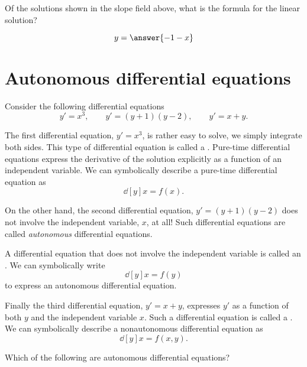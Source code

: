 \documentclass{ximera}
\begin{document}
\begin{question}
  Of the solutions shown in the slope field above, what is the formula
  for the linear solution?
  \begin{prompt}
    \[
    y = \answer{-1-x}
    \]
  \end{prompt}
\end{question}



\section{Autonomous differential equations}


Consider the following differential equations
\[
y' = x^3,\qquad y'=(y+1)(y-2), \qquad y'= x+y.
\]

The first differential equation, $y' = x^3$, is rather easy to solve,
we simply integrate both sides. This type of differential equation is
called a . Pure-time differential
equations express the derivative of the solution explicitly as a
function of an independent variable. We can symbolically describe a
pure-time differential equation as
\[
\dd[y]{x} = f(x).
\]

On the other hand, the second differential equation, $y'=(y+1)(y-2)$
does not involve the independent variable, $x$, at all!  Such
differential equations are called \textit{autonomous} differential
equations.

\begin{definition}
  A differential equation that does not involve the independent
  variable is called an . We can
  symbolically write
  \[
  \dd[y]{x} = f(y)
  \]
  to express an autonomous differential equation.
\end{definition}

Finally the third differential equation, $y'= x+y$, expresses $y'$ as
a function of both $y$ and the independent variable $x$. Such a
differential equation is called a . We can symbolically describe  a nonautonomous differential equation as
\[
\dd[y]{x} = f(x,y).
\]
\begin{question}
  Which of the following are autonomous differential equations?
  \begin{selectAll}
  \end{selectAll}
\end{question}
\end{document}
